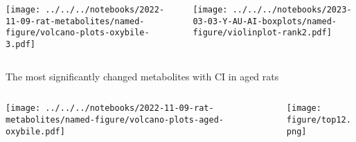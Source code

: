 \documentclass[aspectratio=169]{beamer}
\begin{document}
\begin{frame}{}
\begin{columns}[c]
\begin{column}{0.55\textwidth}

\texttt{[image: ../../../notebooks/2022-11-09-rat-metabolites/named-figure/volcano-plots-oxybile-3.pdf]}
\end{column}
\begin{column}{0.45\textwidth}

\begin{center}
\texttt{[image: ../../../notebooks/2023-03-03-Y-AU-AI-boxplots/named-figure/violinplot-rank2.pdf]}
\end{center}
\end{column}
\end{columns}
\end{frame}

\begin{frame}{The most significantly changed metabolites with CI in aged rats}
\begin{columns}[b]
\begin{column}{0.5\textwidth}

\texttt{[image: ../../../notebooks/2022-11-09-rat-metabolites/named-figure/volcano-plots-aged-oxybile.pdf]}
\end{column}

\begin{column}{0.5\textwidth}

\texttt{[image: figure/top12.png]}
\end{column}
\end{columns}
\end{frame}
\end{document}
